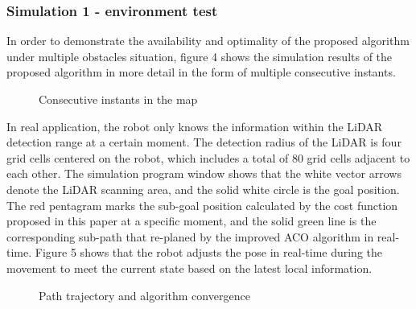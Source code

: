 \documentclass{iosart2c}
\begin{document}
\subsubsection{Simulation 1 - environment test}\label{s4.1.1}
In order to demonstrate the availability and optimality of the proposed algorithm under multiple obstacles situation, figure 4 shows the simulation results of the proposed algorithm in more detail in the form of multiple consecutive instants. 
\begin{figure*}[htbp]
\vspace{-0.1cm} 
\setlength{\abovecaptionskip}{-0.1cm}
\centering
{}\hspace{-10mm}
\hspace{-10mm}  %
\vspace{-4mm}  %
\hspace{-10mm}
\hspace{-10mm}
\caption{ Consecutive instants in the map }
\end{figure*}

In real application, the robot only knows the information within the LiDAR detection range at a certain moment. The detection radius of the LiDAR is four grid cells centered on the robot, which includes a total of 80 grid cells adjacent to each other. The simulation program window shows that the white vector arrows denote the LiDAR scanning area, and the solid white circle is the goal position. The red pentagram marks the sub-goal position calculated by the cost function proposed in this paper at a specific moment, and the solid green line is the corresponding sub-path that re-planed by the improved ACO algorithm in real-time. Figure 5 shows that the robot adjusts the pose in real-time during the movement to meet the current state based on the latest local information.
\begin{figure}[htbp] %
\vspace{-0.2cm}
\setlength{\abovecaptionskip}{0.1cm}  %
\centering
{}\vspace{-4mm}  %
\caption{  Path trajectory and algorithm convergence }
\end{figure}
\end{document}
